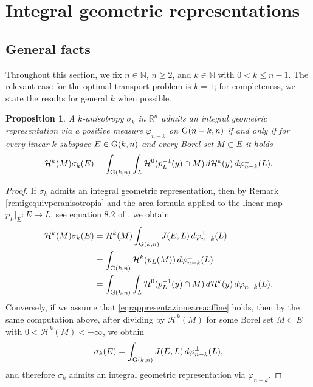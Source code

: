 \documentclass{article}
\numberwithin{equation}{section}
\theoremstyle{plain}%
\newtheorem{proposition}[theorem]{Proposition}
\theoremstyle{definition}
\theoremstyle{definition}
\newcommand{\rgrande}{\mathbb{R}}
\newcommand{\ngrande}{\mathbb{N}}
\newcommand{\haus}{\mathcal{H}}
\newcommand{\grass}{{\rm G}}
\newcommand{\grasskn}{\grass(k,n)}
\newcommand{\grassnmenokn}{\grass(n-k,n)}
\begin{document}
\section{Integral geometric representations}\label{sec:igrep}
\subsection{General facts}
Throughout this section, we fix $n \in \ngrande$, $n \geq 2$, and $k \in \ngrande$ with $0 < k \leq n-1$. The relevant case for the optimal transport problem is $k=1$; for completeness, we state the results for general $k$ when possible.

\begin{proposition}\label{propcollegamentoconmisuraleb}
    A $k$-anisotropy $\sigma_k$ in $\rgrande^n$ admits an integral geometric representation via a positive measure $\varphi_{n-k}$ on $\grassnmenokn$ if and only if for every linear $k$-subspace $E \in \grasskn$ and every Borel set $M \subset E$ it holds
    \begin{equation}\label{eqrappresentazioneareaaffine}
    \haus^k(M) \sigma_k (E) =
    \int_{\grasskn} {\int_{L} { \haus^0( p_L^{-1} (y) \cap M ) } \, d \haus^k(y) } \,d \varphi_{n-k}^{\perp} (L)
    \text{.}
    \end{equation}
\end{proposition}
\begin{proof}
If $\sigma_k$ admits an integral geometric representation, then by Remark \ref{remigequivperanisotropia} and the area formula applied to the linear map $p_L|_E:E\to L$, see equation 8.2 of \cite{MR756417}, we obtain
\begin{equation*}
    \begin{split}
        \haus^k(M) \sigma_k(E)
        &=
        \haus^k(M)
        \int_{\grasskn} J(E,L) \, d \varphi_{n-k}^{\perp} (L)  \\
        &=
        \int_{\grasskn} \haus^k(p_L(M)) \, d \varphi_{n-k}^{\perp}(L) \\
        &=
        \int_{\grasskn} {\int_{L} { \haus^0( p_L^{-1} (y) \cap M ) } \, d \haus^k(y) } \,d \varphi_{n-k}^{\perp} (L)
        \text{.}
    \end{split}
\end{equation*}
Conversely, if we assume that \eqref{eqrappresentazioneareaaffine} holds, then by the same computation above, after dividing by $\haus^k(M)$ for some Borel set $M\subset E$ with $0<\haus^k(M)<+\infty$, we obtain
$$
\sigma_k(E)=\int_{\grasskn}J(E,L)\,d\varphi_{n-k}^{\perp}(L),
$$
and therefore $\sigma_k$ admits an integral geometric representation via $\varphi_{n-k}$.
\end{proof}
\end{document}
